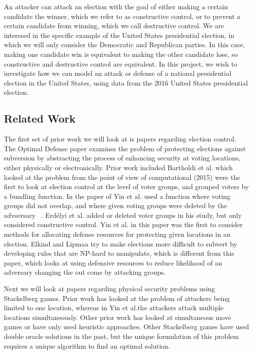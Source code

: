 \documentclass[letterpaper]{article} %
\begin{document}
An attacker can attack an election with the goal of either making a certain candidate the winner, which we refer to as constructive control, or to prevent a certain candidate from winning, which we call destructive control. We are interesed in the specific example of the United States presidential election, in which we will only consider the Democratic and Republican parties. In this case, making one candidate win is equivalent to making the other candidate lose, so constructive and destructive control are equivalent. In this project, we wish to investigate how we can model an attack or defense of a national presidential election in the United States, using data from the 2016 United States presidential election.

\subsection{Related Work}

The first set of prior work we will look at is papers regarding election control. The Optimal Defense paper examines the problem of protecting elections against subversion by abstracting the process of enhancing security at voting locations, either physically or electronically. Prior work included Bartholdi et al. which looked at the problem from the point of view of computational (2015) were the first to look at election control at the level of voter groups, and grouped voters by a bundling function. In the paper of Yin et al. used a function where voting groups did not overlap, and where given voting groups were deleted by the advsersary ~\cite{article}. Erdélyi et al. added or deleted voter groups in his study, but only considered constructive control.  Yin et al. in this paper was the first to consider methods for allocating defense resources for protecting given locations in an election. Elkind and Lipmaa try to make elections more difficult to subvert by developing rules that are NP-hard to manipulate, which is different from this paper, which looks at using defensive resources to reduce likelihood of an adversary changing the out come by attacking groups.

Next we will look at papers regarding physical security problems using Stackelberg games. Prior work has looked at the problem of attackers being limited to one location, whereas in Yin et al.the attackers attack multiple locations simultaneously. Other prior work has looked at simultaneous move games or have only used heuristic approaches. Other Stackelberg games have used double oracle solutions in the past, but the unique formulation of this problem requires a unique algorithm to find an optimal solution.
\end{document}
